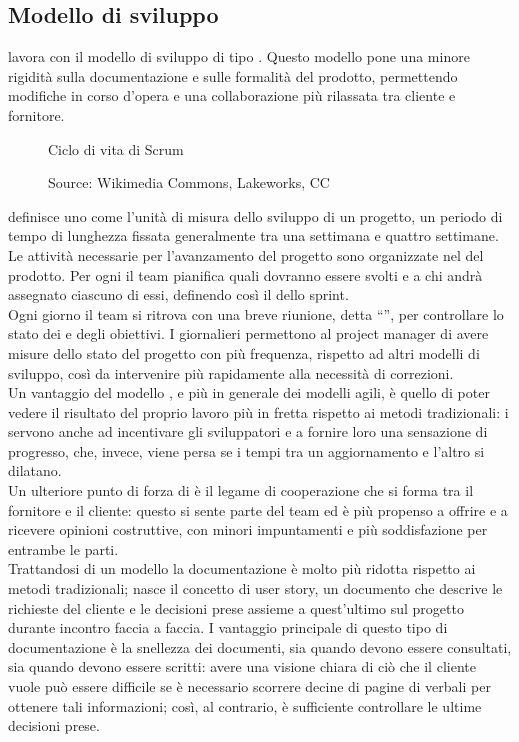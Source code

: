    \subsection{Modello di sviluppo}
   \nomeAzienda{} lavora con il modello di sviluppo  di tipo . Questo modello pone una minore rigidità sulla documentazione e sulle formalità del prodotto, permettendo modifiche in corso d'opera e una collaborazione più rilassata tra cliente e fornitore.
   
   \begin{figure}[htbp]
      \centering
      
      \caption{Ciclo di vita di Scrum}
      \caption*{Source: Wikimedia Commons, Lakeworks, CC}
   \end{figure}
   
    definisce uno  come l'unità di misura dello sviluppo di un progetto, un periodo di tempo di lunghezza fissata generalmente tra una settimana e quattro settimane.
   Le attività necessarie per l'avanzamento del progetto sono organizzate nel  del prodotto.
   Per ogni  il team pianifica quali  dovranno essere svolti e a chi andrà assegnato ciascuno di essi, definendo così il  dello sprint.
   \\
   Ogni giorno il team si ritrova con una breve riunione, detta ``'', per controllare lo stato dei  e degli obiettivi. I  giornalieri permettono al \gls{project manager} di avere misure dello stato del progetto con più frequenza, rispetto ad altri modelli di sviluppo, così da intervenire più rapidamente alla necessità di correzioni.
   \\
   Un vantaggio del modello , e più in generale dei modelli agili, è quello di poter vedere il risultato del proprio lavoro più in fretta rispetto ai metodi tradizionali: i  servono anche ad incentivare gli sviluppatori e a fornire loro una sensazione di progresso, che, invece, viene persa se i tempi tra un aggiornamento e l'altro si dilatano.
   \\
   Un ulteriore punto di forza di  è il legame di cooperazione che si forma tra il fornitore e il cliente: questo si sente parte del team ed è più propenso a offrire e a ricevere opinioni costruttive, con minori impuntamenti e più soddisfazione per entrambe le parti.
   \\
   Trattandosi di un modello  la documentazione è molto più ridotta rispetto ai metodi tradizionali; nasce il concetto di user story, un documento che descrive le richieste del cliente e le decisioni prese assieme a quest'ultimo sul progetto durante incontro faccia a faccia. I vantaggio principale di questo tipo di documentazione è la snellezza dei documenti, sia quando devono essere consultati, sia quando devono essere scritti: avere una visione chiara di ciò che il cliente vuole può essere difficile se è necessario scorrere decine di pagine di verbali per ottenere tali informazioni; così, al contrario, è sufficiente controllare le ultime decisioni prese.
